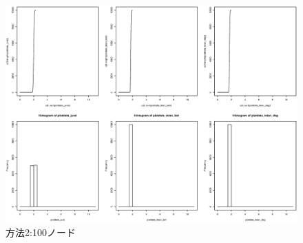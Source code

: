 \begin{landscape}
\begin{figure}[H]
  \centering
  \includegraphics[width=1.2\textwidth]{figures/2_100.eps}
  \caption{方法2:100ノード}
  \label{fig:2_100}
\end{figure}
\end{landscape}